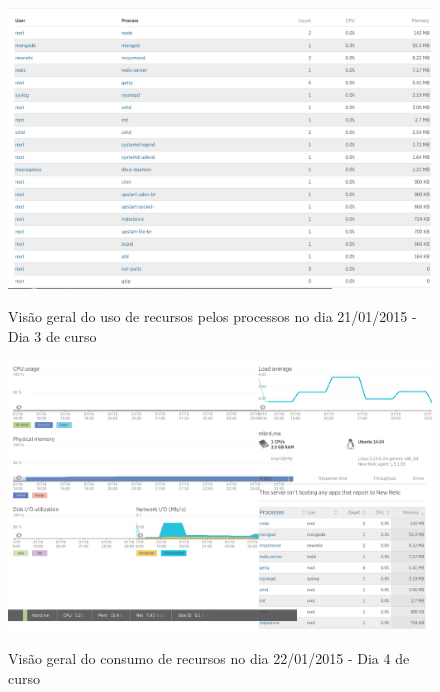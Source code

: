 \documentclass[
	12pt,				%
	oneside,			%
	a4paper,			%
	english,			%
	brazil				%
	]{abntex2ppgsi}
\begin{document}
\begin{apendicesenv}
\begin{figure}[h]
\centering
\caption{Visão geral do uso de recursos pelos processos no dia 21/01/2015 - Dia 3 de curso}
\includegraphics[page=2,width=1.0\textwidth]{relatorios/21-01-15/process-inspector_cropped.pdf} 
\label{fig:recursos_dia1_5} 
\end{figure}




\begin{figure}[h]
\centering
\caption{Visão geral do consumo de recursos no dia 22/01/2015 - Dia 4 de curso}
\includegraphics[width=1.0\textwidth]{relatorios/22-01-15/dashboard_cropped.pdf} 
\label{fig:recursos_dia1_1} 
\end{figure}


\end{apendicesenv}
\end{document}

